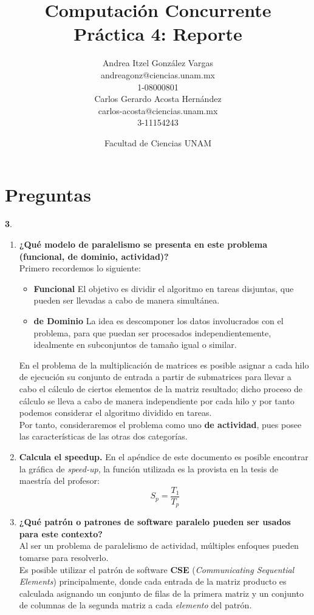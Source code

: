 \documentclass[12pt]{article}
\title{Computación Concurrente \\ Práctica 4: Reporte}
\author{Andrea Itzel González Vargas\\ andreagonz@ciencias.unam.mx \\ 1-08000801\\Carlos Gerardo Acosta Hernández\\carlos-acosta@ciencias.unam.mx\\3-11154243}
\date{Facultad de Ciencias UNAM}
\begin{document}
\maketitle
\section{Preguntas}
\textbf{3}.
\begin{enumerate}[label=(\alph*)]
\item \textbf{¿Qué modelo de paralelismo se presenta en este problema (funcional, de dominio, actividad)?}\\
  Primero recordemos lo siguiente:
  \begin{itemize}
  \item \textbf{Funcional} El objetivo es dividir el algoritmo en tareas disjuntas, que pueden ser llevadas a cabo de manera simultánea. 
  \item \textbf{de Dominio} La idea es descomponer los datos involucrados con el problema, para que
    puedan ser procesados independientemente, idealmente en subconjuntos de tamaño igual o similar.
  \end{itemize}
  En el problema de la multiplicación de matrices es posible asignar a cada hilo de ejecución su conjunto de entrada a partir de submatrices para llevar a cabo el cálculo de ciertos elementos de la matriz resultado; dicho proceso de cálculo se lleva a cabo de manera independiente por cada hilo y por tanto podemos considerar el algoritmo dividido en tareas.\\
  Por tanto, consideraremos el problema como uno \textbf{de actividad}, pues posee las características de las otras dos categorías.
\item \textbf{Calcula el speedup.}
  En el apéndice de este documento es posible encontrar la gráfica de \textit{speed-up}, la función utilizada es la provista en la tesis de maestría del profesor:
  \begin{equation}
    S_p = \frac{T_1}{T_p}
  \end{equation}
\item \textbf{¿Qué patrón o patrones de software paralelo pueden ser usados para este contexto?}\\
  Al ser un problema de paralelismo de actividad, múltiples enfoques pueden tomarse para resolverlo.\\
  Es posible utilizar el patrón de software \textbf{CSE} (\textit{Communicating Sequential Elements}) principalmente,
  donde cada entrada de la matriz producto es calculada asignando un conjunto de filas de la primera matriz y un conjunto de columnas de la segunda matriz a cada \textit{elemento} del patrón.\\

\end{enumerate}
\end{document}
